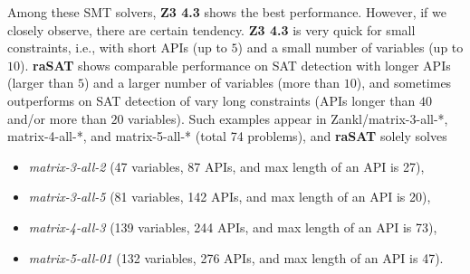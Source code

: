 \documentclass[runningheads,a4paper,oribibl]{llncs}
\begin{document}
Among these SMT solvers, {\bf Z3 4.3} shows the best performance. 
However, if we closely observe, there are certain tendency. 
{\bf Z3 4.3} is very quick for small constraints, i.e., with 
short APIs (up to $5$) and a small number of variables (up to $10$). 
{\bf raSAT} shows comparable performance on SAT detection with 
longer APIs (larger than $5$) and a larger number of variables (more than $10$), 
and sometimes outperforms on SAT detection of vary long constraints 
(APIs longer than $40$ and/or more than $20$ variables). 
Such examples appear in Zankl/matrix-3-all-*, matrix-4-all-*, and matrix-5-all-* 
(total 74 problems), and {\bf raSAT} solely solves 
\begin{itemize}
\item {\em matrix-3-all-2} (47 variables, 87 APIs, and max length of an API is 27), 
\item {\em matrix-3-all-5} (81 variables, 142 APIs, and max length of an API is 20), 
\item {\em matrix-4-all-3} (139 variables, 244 APIs, and max length of an API is 73), %
\item {\em matrix-5-all-01} (132 variables, 276 APIs, and max length of an API is 47). 
\end{itemize}
\end{document}

